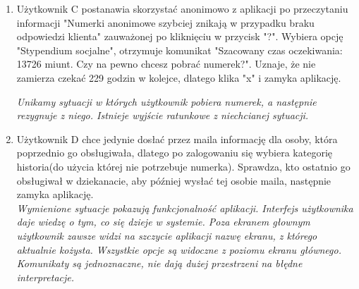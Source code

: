 \documentclass[12pt]{article}
\begin{document}
\begin {enumerate}
	\textit{Komunikaty ostrzegawcze są przedstawione w prostym języku i jednoznacznie wskazują na konsekwencję danego działania; istnieje wyjście ratunkowe z niechcianej sytuacji.}\\
	
	\item Użytkownik C postanawia skorzystać anonimowo z aplikacji po przeczytaniu informacji "Numerki anonimowe szybciej znikają w przypadku braku odpowiedzi klienta" zauważonej po kliknięciu w przycisk "?". Wybiera opcję "Stypendium socjalne", otrzymuje komunikat "Szacowany czas oczekiwania: 13726 miunt. Czy na pewno chcesz pobrać numerek?". Uznaje, że nie zamierza czekać 229 godzin w kolejce, dlatego klika "x" i zamyka aplikację.
	
	\textit{Unikamy sytuacji w których użytkownik pobiera numerek, a następnie rezygnuje z niego. Istnieje wyjście ratunkowe z niechcianej sytuacji.}\\
	
	
	\item Użytkownik D chce jedynie dosłać przez maila informację dla osoby, która poprzednio go obsługiwała, dlatego po zalogowaniu się wybiera kategorię historia(do użycia której nie potrzebuje numerka). Sprawdza, kto ostatnio go obsługiwał w dziekanacie, aby później wysłać tej osobie maila, następnie zamyka aplikację.\\
	
	\textit{Wymienione sytuacje pokazują funkcjonalność aplikacji. Interfejs użytkownika daje wiedzę o tym, co się dzieje w systemie. Poza ekranem głownym użytkownik zawsze widzi na szczycie aplikacji nazwę ekranu, z którego aktualnie kożysta. Wszystkie opcje są widoczne z poziomu ekranu głównego. Komunikaty są jednoznaczne, nie dają dużej przestrzeni na błędne interpretacje.}

\end{enumerate}
\end{document}
